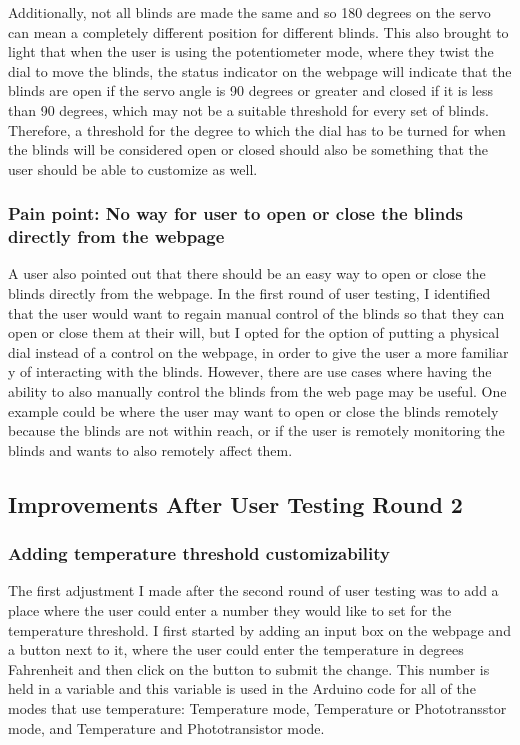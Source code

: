 \documentclass[10pt,twocolumn]{article}
\begin{document}
Additionally, not all blinds are made the same and so 180 degrees on the servo can mean a completely different position for different blinds. This also brought to light that when the user is using the potentiometer mode, where they twist the dial to move the blinds, the status indicator on the webpage will indicate that the blinds are open if the servo angle is 90 degrees or greater and closed if it is less than 90 degrees, which may not be a suitable threshold for every set of blinds. Therefore, a threshold for the degree to which the dial has to be turned for when the blinds will be considered open or closed should also be something that the user should be able to customize as well. 

\subsubsection{Pain point: No way for user to open or close the blinds directly from the webpage}
A user also pointed out that there should be an easy way to open or close the blinds directly from the webpage. In the first round of user testing, I identified that the user would want to regain manual control of the blinds so that they can open or close them at their will, but I opted for the option of putting a physical dial instead of a control on the webpage, in order to give the user a more familiar y of interacting with the blinds. However, there are use cases where having the ability to also manually control the blinds from the web page may be useful. One example could be where the user may want to open or close the blinds remotely because the blinds are not within reach, or if the user is remotely monitoring the blinds and wants to also remotely affect them.

\subsection{Improvements After User Testing Round 2}
\subsubsection{Adding temperature threshold customizability}
The first adjustment I made after the second round of user testing was to add a place where the user could enter a number they would like to set for the temperature threshold. I first started by adding an input box on the webpage and a button next to it, where the user could enter the temperature in degrees Fahrenheit and then click on the button to submit the change. This number is held in a variable and this variable  is used in the Arduino code for all of the modes that use temperature: Temperature mode, Temperature or Phototransstor mode, and Temperature and Phototransistor mode.
\end{document}
